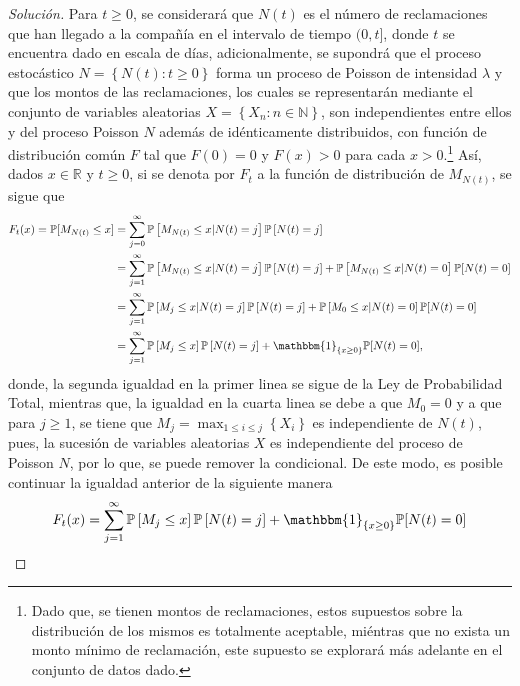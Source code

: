\documentclass[10.5pt,notitlepage]{article}
\newenvironment{solucion}
  {\begin{proof}[Solución]}
  {\end{proof}}
\newcommand{\PP}{\mathbb{P}}
\newcommand{\RR}{\mathbb{R}}
\newcommand{\NN}{\mathbb{N}}
\newcommand{\corch}[1]{\left[ #1 \right]}
\newcommand{\kis}[1]{\left\{ #1 \right\}}
\theoremstyle{plain}
\begin{document}
\begin{solucion}
Para \(t \geq 0\), se considerará que \(N(t)\) es el número de reclamaciones que han llegado a la compañía en el intervalo de tiempo \((0,t]\), donde \(t\) se encuentra dado en escala de días, adicionalmente, se supondrá que el proceso estocástico \(N = \kis{N(t) : t\geq 0}\) forma un proceso de Poisson de intensidad \(\lambda\) y que los montos de las reclamaciones, los cuales se representarán mediante el conjunto de variables aleatorias \(X = \kis{X_n : n \in \NN}\), son independientes entre ellos y del proceso Poisson \(N\) además de idénticamente distribuidos, con función de distribución común \(F\) tal que \(F(0) = 0\) y \(F(x)>0\) para cada \(x > 0\).\footnote{Dado que, se tienen montos de reclamaciones, estos supuestos sobre la distribución de los mismos es totalmente aceptable, miéntras que no exista un monto mínimo de reclamación, este supuesto se explorará más adelante en el conjunto de datos dado.} Así, dados \(x \in \RR\) y \(t \geq 0\), si se denota por \(F_{t}\) a la función de distribución de \(M_{N(t)}\), se sigue que 
\begin{align*}
    F_{t}(x) = \PP[M_{N(t)} \leq x] &= \sum_{j = 0}^{\infty}\PP\corch{M_{N(t)}\leq x| N(t) = j}\PP\corch{N(t) =  j}\\ 
                                    &= \sum_{j = 1}^{\infty}\PP\corch{M_{N(t)}\leq x| N(t) = j}\PP\corch{N(t) =  j} + \PP\corch{M_{N(t)}\leq x| N(t) = 0}\PP[N(t) = 0]\\
                                    &= \sum_{j = 1}^{\infty}\PP\corch{M_{j}\leq x| N(t) = j}\PP\corch{N(t) =  j} + \PP\corch{M_{0}\leq x| N(t) = 0}\PP[N(t) = 0]\\
                                    &=  \sum_{j = 1}^{\infty}\PP\corch{M_{j}\leq x}\PP\corch{N(t) =  j} + \mathbbm{1}_{\kis{x \geq 0}}\PP[N(t) = 0],
\end{align*}
donde, la segunda igualdad en la primer linea se sigue de la Ley de Probabilidad Total, mientras que, la igualdad en la cuarta linea se debe a que \(M_{0} = 0\) y a que para \(j \geq 1\), se tiene que \(M_{j} = \max_{1 \leq i \leq j}\kis{X_i}\) es independiente de \(N(t)\), pues, la sucesión de variables aleatorias \(X\) es independiente del proceso de Poisson \(N\), por lo que, se puede remover la condicional. De este modo, es posible continuar la igualdad anterior de la siguiente manera 
\begin{align*}
      F_{t}(x) &=  \sum_{j = 1}^{\infty}\PP\corch{M_{j}\leq x}\PP\corch{N(t) =  j} + \mathbbm{1}_{\kis{x \geq 0}}\PP[N(t) = 0]\\ 

\end{align*}
\end{solucion}
\end{document}
